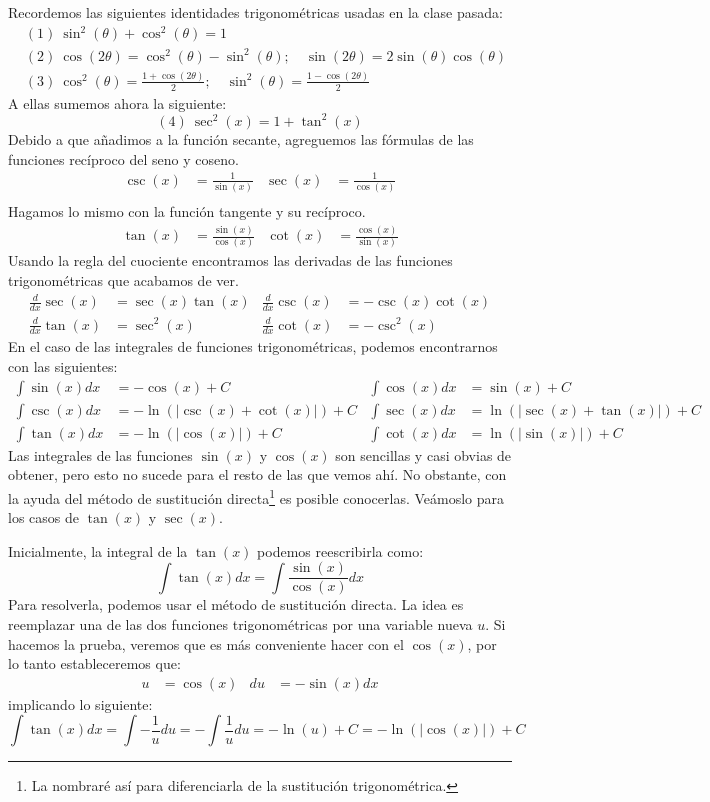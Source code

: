 \documentclass[12pt]{article}
\begin{document}
Recordemos las siguientes identidades trigonométricas usadas en la clase pasada:
\begin{align*}
&(1) \ \sin^{2}(\theta) + \cos^{2}(\theta) = 1 \\
&(2) \ \cos(2\theta) = \cos^{2}(\theta) - \sin^{2}(\theta); \quad \sin(2\theta) = 2\sin(\theta)\cos(\theta) \\
&(3) \ \cos^{2}(\theta) = \frac{1 + \cos(2\theta)}{2}; \quad \sin^{2}(\theta) = \frac{1 - \cos(2\theta)}{2}
\end{align*}
A ellas sumemos ahora la siguiente:
\[
  (4) \ \sec^{2}(x) = 1 + \tan^{2}(x)
\]
Debido a que añadimos a la función secante, agreguemos las fórmulas de las funciones recíproco del seno y coseno.
\begin{align*}
  \csc(x) &= \frac{1}{\sin(x)} &
  \sec(x) &= \frac{1}{\cos(x)} \\
\end{align*}
Hagamos lo mismo con la función tangente y su recíproco.
\begin{align*}
  \tan(x) &= \frac{\sin(x)}{\cos(x)} &
  \cot(x) &= \frac{\cos(x)}{\sin(x)}
\end{align*}
Usando la regla del cuociente encontramos las derivadas de las funciones trigonométricas que acabamos de ver.
\begin{align*}
  \frac{d}{dx}\sec(x) &= \sec(x)\tan(x) & \frac{d}{dx}\csc(x) &= -\csc(x)\cot(x) \\
  \frac{d}{dx}\tan(x) &= \sec^{2}(x) & \frac{d}{dx}\cot(x) &= -\csc^{2}(x)
\end{align*}
En el caso de las integrales de funciones trigonométricas, podemos encontrarnos con las siguientes:
\begin{align*}
  \int \sin(x) dx &= -\cos(x) + C & \int \cos(x) dx &= \sin(x) + C \\
  \int \csc(x) dx &= - \ln(|\csc(x) + \cot(x)|) + C & \int \sec(x) dx &= \ln(|\sec(x) + \tan(x)|) + C \\
  \int \tan(x) dx &= - \ln(|\cos(x)|) + C & \int \cot(x) dx &= \ln(|\sin(x)|) + C
\end{align*}
Las integrales de las funciones $\sin(x)$ y $\cos(x)$ son sencillas y casi obvias de obtener, pero esto no sucede para el resto de las que vemos ahí. No obstante, con la ayuda del método de sustitución directa\footnote{La nombraré así para diferenciarla de la sustitución trigonométrica.} es posible conocerlas. Veámoslo para los casos de $\tan(x)$ y $\sec(x)$.

Inicialmente, la integral de la $\tan(x)$ podemos reescribirla como:
\[
 \int \tan(x)dx = \int \frac{\sin(x)}{\cos(x)} dx
\]
Para resolverla, podemos usar el método de sustitución directa. La idea es reemplazar una de las dos funciones trigonométricas por una variable nueva $u$. Si hacemos la prueba, veremos que es más conveniente hacer con el $\cos(x)$, por lo tanto estableceremos que:
\begin{align*}
  u &= \cos(x) & du &= -\sin(x)dx
\end{align*}
implicando lo siguiente:
\[
  \int \tan(x)dx = \int - \frac{1}{u} du = - \int \frac{1}{u} du = - \ln(u) + C = - \ln(|\cos(x)|) + C
\]
\end{document}
